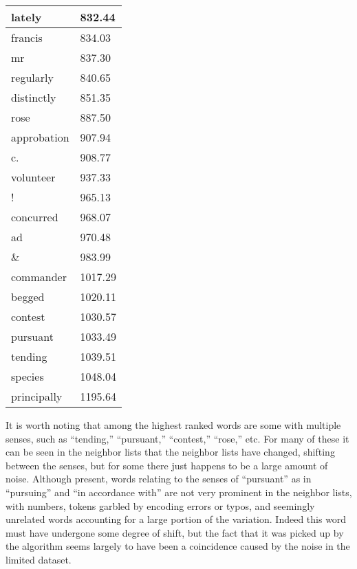\documentclass{article}
\begin{document}
\begin{longtable}[c]{ll}
\multicolumn{1}{l|}{lately}          & 832.44  \\ \hline
\multicolumn{1}{l|}{francis}         & 834.03  \\ \hline
\multicolumn{1}{l|}{mr}              & 837.30  \\ \hline
\multicolumn{1}{l|}{regularly}       & 840.65  \\ \hline
\multicolumn{1}{l|}{distinctly}      & 851.35  \\ \hline
\multicolumn{1}{l|}{rose}            & 887.50  \\ \hline
\multicolumn{1}{l|}{approbation}     & 907.94  \\ \hline
\multicolumn{1}{l|}{c.}              & 908.77  \\ \hline
\multicolumn{1}{l|}{volunteer}       & 937.33  \\ \hline
\multicolumn{1}{l|}{!}               & 965.13  \\ \hline
\multicolumn{1}{l|}{concurred}       & 968.07  \\ \hline
\multicolumn{1}{l|}{ad}              & 970.48  \\ \hline
\multicolumn{1}{l|}{\& }             & 983.99  \\ \hline
\multicolumn{1}{l|}{commander}       & 1017.29 \\ \hline
\multicolumn{1}{l|}{begged}          & 1020.11 \\ \hline
\multicolumn{1}{l|}{contest}         & 1030.57 \\ \hline
\multicolumn{1}{l|}{pursuant}        & 1033.49 \\ \hline
\multicolumn{1}{l|}{tending}         & 1039.51 \\ \hline
\multicolumn{1}{l|}{species}         & 1048.04 \\ \hline
\multicolumn{1}{l|}{principally}     & 1195.64 \\ \hline
\end{longtable}


It is worth noting that among the highest ranked words are some with multiple senses, such as ``tending,'' ``pursuant,'' ``contest,'' ``rose,'' etc. For many of these it can be seen in the neighbor lists that the neighbor lists have changed, shifting between the senses, but for some there just happens to be a large amount of noise. Although present, words relating to the senses of ``pursuant'' as in ``pursuing'' and ``in accordance with'' are not very prominent in the neighbor lists, with numbers, tokens garbled by encoding errors or typos, and seemingly unrelated words accounting for a large portion of the variation. Indeed this word must have undergone some degree of shift, but the fact that it was picked up by the algorithm seems largely to have been a coincidence caused by the noise in the limited dataset.
\end{document}
